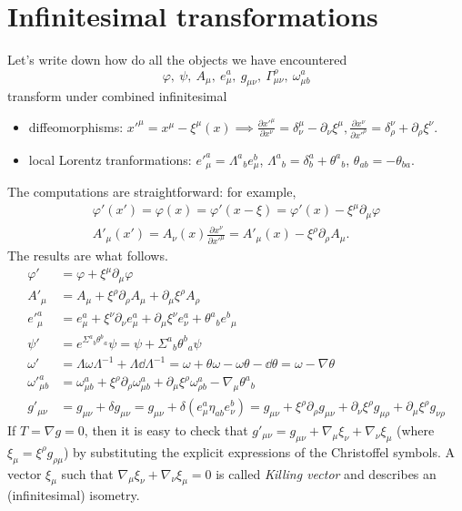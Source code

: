 \documentclass[a4paper,12pt]{book}
\begin{document}
\section{Infinitesimal transformations}
Let's write down how do all the objects we have encountered
\[\varphi,\ \psi,\ A_\mu,\ e^a_\mu,\ g_{\mu\nu},\ \Gamma^\rho_{\mu\nu},\ \omega^a_{\mu b}\]
transform under combined infinitesimal
\begin{itemize}
\item diffeomorphisms: $x'^\mu=x^\mu-\xi^\mu(x)\implies\frac{\partial x'^\mu}{\partial x^\nu}=\delta^\mu_\nu-\partial_\nu\xi^\mu,\frac{\partial x^\nu}{\partial x'^\rho}=\delta^\nu_\rho+\partial_\rho\xi^\nu$.
\item local Lorentz tranformations: $e'^a_\mu=\Lambda^a{}_be^b_\mu$, $\Lambda^a{}_b=\delta^a_b+\theta^a{}_b$, $\theta_{ab}=-\theta_{ba}$.
\end{itemize}
The computations are straightforward: for example,
\begin{gather*}
\varphi'(x')=\varphi(x)=\varphi'(x-\xi)=\varphi'(x)-\xi^\mu\partial_\mu\varphi\\
A'_\mu(x')=A_\nu(x)\frac{\partial x^\nu}{\partial x'^\mu}=A'_\mu(x)-\xi^\rho\partial_\rho A_\mu.
\end{gather*}
The results are what follows.
\begin{align*}
\varphi'&=\varphi+\xi^\mu\partial_\mu\varphi\\
A'_\mu&=A_\mu+\xi^\rho\partial_\rho A_\mu+\partial_\mu\xi^\rho A_\rho\\
e'^a_\mu&=e^a_\mu+\xi^\nu\partial_\nu e^a_\mu+\partial_\mu\xi^\nu e^a_\nu+\theta^a{}_b e^b{}_\mu\\
\psi'&=e^{\Sigma^a{}_b\theta^b{}_a}\psi=\psi+\Sigma^a{}_b\theta^b{}_a\psi\\
\omega'&=\Lambda\omega\Lambda^{-1}+\Lambda\dd\Lambda^{-1}=\omega+\theta\omega-\omega\theta-\dd\theta=\omega-\nabla\theta\\
\omega'^a_{\mu b}&=\omega^a_{\mu b}+\xi^\rho\partial_\rho\omega^a_{\mu b}+\partial_\mu\xi^\rho\omega^a_{\rho b}-\nabla_\mu\theta^a{}_b\\
g'_{\mu\nu}&=g_{\mu\nu}+\delta g_{\mu\nu}=g_{\mu\nu}+\delta(e^a_\mu\eta_{ab}e^b_\nu)=g_{\mu\nu}+\xi^\rho\partial_\rho g_{\mu\nu}+\partial_\nu\xi^\rho g_{\mu\rho}+\partial_\mu\xi^\rho g_{\nu\rho}
\end{align*}
If $T=\nabla g=0$, then it is easy to check that $g'_{\mu\nu}=g_{\mu\nu}+\nabla_\mu\xi_\nu+\nabla_\nu\xi_\mu$ (where $\xi_\mu=\xi^\rho g_{\rho\mu}$) by substituting the explicit expressions of the Christoffel symbols. A vector $\xi_\mu$ such that $\nabla_\mu\xi_\nu+\nabla_\nu\xi_\mu=0$ is called \emph{Killing vector} and describes an (infinitesimal) isometry.
\end{document}
